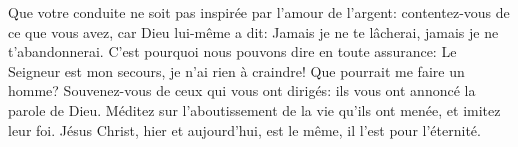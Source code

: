 Que votre conduite ne soit pas inspirée par l’amour de l’argent:
	contentez-vous de ce que vous avez, car Dieu lui-même a dit:
	Jamais je ne te lâcherai, jamais je ne t’abandonnerai.
C’est pourquoi nous pouvons dire en toute assurance:
	Le Seigneur est mon secours, je n’ai rien à craindre!
	Que pourrait me faire un homme?
Souvenez-vous de ceux qui vous ont dirigés: ils vous ont annoncé la parole de Dieu.
	Méditez sur l’aboutissement de la vie qu’ils ont menée, et imitez leur foi.
Jésus Christ, hier et aujourd’hui, est le même, il l’est pour l’éternité.
